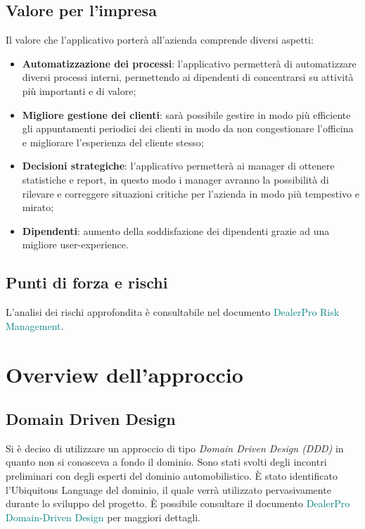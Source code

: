 \documentclass{article}
\begin{document}
  \subsection{Valore per l'impresa}

  Il valore che l'applicativo porterà all'azienda comprende diversi aspetti:
  \begin{itemize}
    \item \textbf{Automatizzazione dei processi}: l'applicativo permetterà di automatizzare 
      diversi processi interni, permettendo ai dipendenti di concentrarsi su attività più 
      importanti e di valore;
    \item \textbf{Migliore gestione dei clienti}: sarà possibile gestire in modo più efficiente gli appuntamenti
      periodici dei clienti in modo da non congestionare l'officina e migliorare l'esperienza del cliente stesso;
    \item \textbf{Decisioni strategiche}: l'applicativo permetterà ai manager di ottenere statistiche e report, in questo
      modo i manager avranno la possibilità di rilevare e correggere situazioni critiche per l'azienda in modo più tempestivo
      e mirato;
    \item \textbf{Dipendenti}: aumento della soddisfazione dei dipendenti grazie ad una migliore user-experience.
  \end{itemize}


  \subsection{Punti di forza e rischi}
  L'analisi dei rischi approfondita è consultabile nel documento \textcolor{teal}{DealerPro Risk Management}.

  \newpage
  \section{Overview dell'approccio}

  \subsection{Domain Driven Design}

  Si è deciso di utilizzare un approccio di tipo \emph{Domain Driven Design (DDD)} in quanto non si conosceva 
  a fondo il dominio. Sono stati svolti degli incontri preliminari con degli esperti del 
  dominio automobilistico. È stato identificato l’Ubiquitous Language del dominio, il quale verrà utilizzato 
  pervasivamente durante lo sviluppo del progetto. 
  È possibile consultare il documento \textcolor{teal}{DealerPro Domain-Driven Design} per maggiori dettagli.
\end{document}
